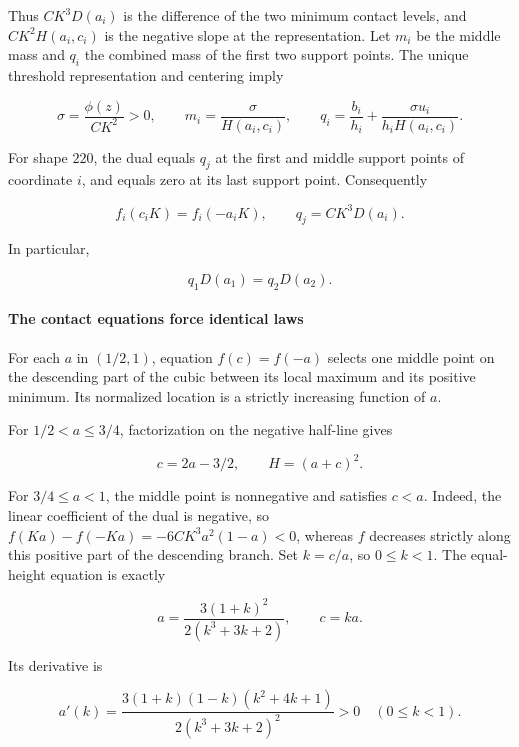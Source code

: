 Thus $C K^3 D(a_i)$ is the difference of the two minimum contact
levels, and $C K^2 H(a_i,c_i)$ is the negative slope at the representation.
Let $m_i$ be the middle mass and $q_i$ the combined mass of the first
two support points. The unique threshold representation and centering imply

\[
 \sigma=\frac{\phi(z)}{C K^2}>0,\qquad
 m_i=\frac\sigma{H(a_i,c_i)},\qquad
 q_i=\frac{b_i}{h_i}+\frac{\sigma u_i}{h_iH(a_i,c_i)}.
\tag{B.6.3}\label{contact:two-triple-rectangle-exclusion-3}
\]

For shape $220$, the dual equals $q_j$ at the first and middle support
points of coordinate $i$, and equals zero at its last support point.
Consequently

\[
 f_i(c_iK)=f_i(-a_iK),\qquad
 q_j=C K^3D(a_i).
\tag{B.6.4}\label{contact:two-triple-rectangle-exclusion-4}
\]

In particular,

\[
 q_1D(a_1)=q_2D(a_2).
\tag{B.6.5}\label{contact:two-triple-rectangle-exclusion-5}
\]

\paragraph{The contact equations force identical laws}

For each $a$ in $(1/2,1)$, equation $f(c)=f(-a)$ selects one middle
point on the descending part of the cubic between its local maximum and
its positive minimum. Its normalized location is a strictly increasing
function of $a$.

For $1/2<a\le 3/4$, factorization on the negative half-line gives

\[
 c=2a-3/2,\qquad H=(a+c)^2.
\tag{B.6.6}\label{contact:two-triple-rectangle-exclusion-6}
\]

For $3/4\le a<1$, the middle point is nonnegative and satisfies $c<a$.
Indeed, the linear coefficient of the dual is negative, so
$f(Ka)-f(-Ka)=-6CK^3a^2(1-a)<0$, whereas $f$ decreases
strictly along this positive part of the descending branch. Set
$k=c/a$, so $0\le k<1$. The equal-height equation is exactly

\[
 a=\frac{3(1+k)^2}{2(k^3+3k+2)},\qquad c=ka.
\tag{B.6.7}\label{contact:two-triple-rectangle-exclusion-7}
\]

Its derivative is

\[
 a'(k)=\frac{3(1+k)(1-k)(k^2+4k+1)}{2(k^3+3k+2)^2}>0
 \quad(0\leq k<1).
\tag{B.6.8}\label{contact:two-triple-rectangle-exclusion-8}
\]

